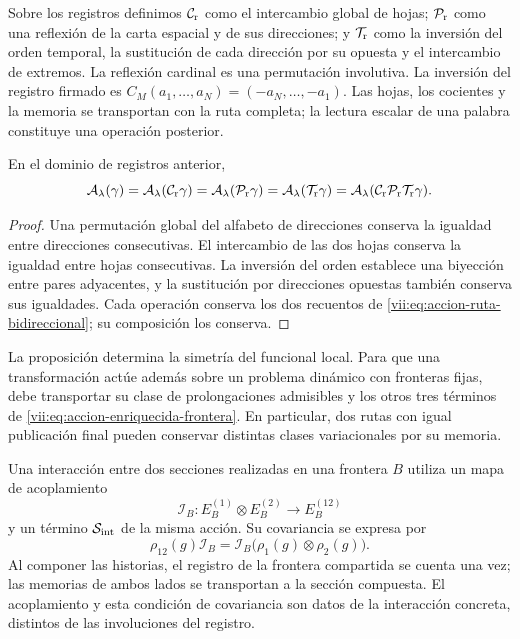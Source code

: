 Sobre los registros definimos \(\mathcal C_{\rm r}\) como el intercambio
global de hojas; \(\mathcal P_{\rm r}\) como una reflexión de la carta
espacial y de sus direcciones; y \(\mathcal T_{\rm r}\) como la inversión
del orden temporal, la sustitución de cada dirección por su opuesta y el
intercambio de extremos. La reflexión cardinal es una permutación involutiva.
La inversión del registro firmado es
\(C_M(a_1,\ldots,a_N)=(-a_N,\ldots,-a_1)\).
Las hojas, los cocientes y la memoria se transportan con la ruta completa;
la lectura escalar de una palabra constituye una operación posterior.

\begin{proposition}
\label{vii:prop:invariancia-ruta-bidireccional}
En el dominio de registros anterior,
\[
 \mathcal A_\lambda(\gamma)
 =\mathcal A_\lambda(\mathcal C_{\rm r}\gamma)
 =\mathcal A_\lambda(\mathcal P_{\rm r}\gamma)
 =\mathcal A_\lambda(\mathcal T_{\rm r}\gamma)
 =\mathcal A_\lambda(\mathcal C_{\rm r}\mathcal P_{\rm r}
                              \mathcal T_{\rm r}\gamma).
\]
\end{proposition}
\begin{proof}
Una permutación global del alfabeto de direcciones conserva la igualdad
entre direcciones consecutivas. El intercambio de las dos hojas conserva
la igualdad entre hojas consecutivas. La inversión del orden establece una
biyección entre pares adyacentes, y la sustitución por direcciones opuestas
también conserva sus igualdades. Cada operación conserva los dos recuentos
de \eqref{vii:eq:accion-ruta-bidireccional}; su composición los conserva.
\end{proof}

La proposición determina la simetría del funcional local. Para que una
transformación actúe además sobre un problema dinámico con fronteras fijas,
debe transportar su clase de prolongaciones admisibles y los otros tres
términos de \eqref{vii:eq:accion-enriquecida-frontera}. En particular, dos
rutas con igual publicación final pueden conservar distintas clases
variacionales por su memoria.

Una interacción entre dos secciones realizadas en una frontera \(B\)
utiliza un mapa de acoplamiento
\[
 \mathcal I_B:E_B^{(1)}\otimes E_B^{(2)}\longrightarrow E_B^{(12)}
\]
y un término \(\mathcal S_{\rm int}\) de la misma acción. Su covariancia
se expresa por
\[
 \rho_{12}(g)\mathcal I_B
 =\mathcal I_B\bigl(\rho_1(g)\otimes\rho_2(g)\bigr).
\]
Al componer las historias, el registro de la frontera compartida se cuenta
una vez; las memorias de ambos lados se transportan a la sección compuesta.
El acoplamiento y esta condición de covariancia son datos de la interacción
concreta, distintos de las involuciones del registro.

